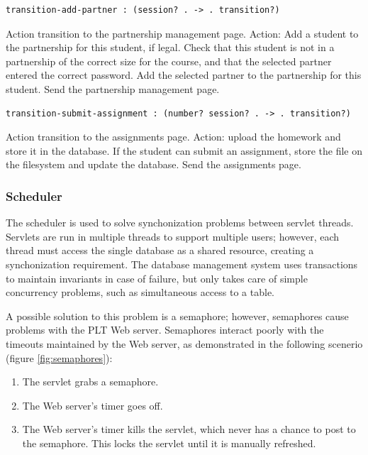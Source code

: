 \documentclass[a4paper]{article}
\begin{document}
\begin{verbatim}
transition-add-partner : (session? . -> . transition?)
\end{verbatim}
Action transition to the partnership management page.
Action: Add a student to the partnership for this student, if legal.
Check that this student is not in a partnership of the correct size for the
course, and that the selected partner entered the correct password. Add
the selected partner to the partnership for this student. Send the partnership
management page.

\begin{verbatim}
transition-submit-assignment : (number? session? . -> . transition?)
\end{verbatim}
Action transition to the assignments page.
Action: upload the homework and store it in the database.
If the student can submit an assignment, store the file on the filesystem and
update the database. Send the assignments page.

\subsubsection{Scheduler}\label{subsubsec:scheduler}

The scheduler is used to solve synchonization problems between servlet threads.
Servlets are run in multiple threads to support multiple users; however, each
thread must access the single database as a shared resource, creating a
synchonization requirement. The database management system uses transactions to
maintain invariants in case of failure, but only takes care of simple
concurrency problems, such as simultaneous access to a table.

A possible solution to this problem is a semaphore; however, semaphores cause
problems with the PLT Web server. Semaphores interact poorly with the timeouts
maintained by the Web server, as demonstrated in the following scenerio (figure
\ref{fig:semaphores}):

\begin{enumerate}
\item{The servlet grabs a semaphore.}
\item{The Web server's timer goes off.}
\item{The Web server's timer kills the servlet, which never has a chance to
post to the semaphore. This locks the servlet until it is manually refreshed.}
\end{enumerate}


\end{document}
